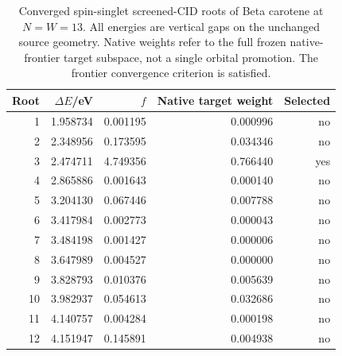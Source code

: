 \begin{table}[!htbp]\centering\small
\caption{Converged spin-singlet screened-CID roots of Beta carotene at $N=W=13$. All energies are vertical gaps on the unchanged source geometry. Native weights refer to the full frozen native-frontier target subspace, not a single orbital promotion. The frontier convergence criterion is satisfied.}
\label{tab:beta_transition_cid}
\begin{tabular}{rrrrr}\toprule
Root & $\Delta E$/eV & $f$ & Native target weight & Selected\\\midrule
1 & 1.958734 & 0.001195 & 0.000996 & no\\
2 & 2.348956 & 0.173595 & 0.034346 & no\\
3 & 2.474711 & 4.749356 & 0.766440 & yes\\
4 & 2.865886 & 0.001643 & 0.000140 & no\\
5 & 3.204130 & 0.067446 & 0.007788 & no\\
6 & 3.417984 & 0.002773 & 0.000043 & no\\
7 & 3.484198 & 0.001427 & 0.000006 & no\\
8 & 3.647989 & 0.004527 & 0.000000 & no\\
9 & 3.828793 & 0.010376 & 0.005639 & no\\
10 & 3.982937 & 0.054613 & 0.032686 & no\\
11 & 4.140757 & 0.004284 & 0.000198 & no\\
12 & 4.151947 & 0.145891 & 0.004938 & no\\
\bottomrule\end{tabular}
\end{table}
